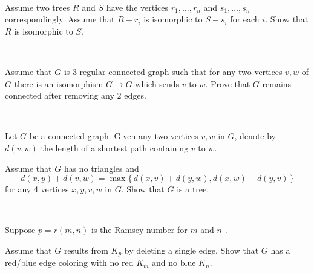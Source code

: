 \documentclass[oneside,a4paper]{article}
\begin{document}
\ 

Assume two trees $R$ and $S$ 
have the vertices $r_1,\dots,r_n$ and $s_1,\dots,s_n$ correspondingly.
Assume that $R-r_i$ is isomorphic to $S-s_i$ for each $i$.
Show that $R$ is isomorphic to $S$.

\ 

Assume that $G$ is $3$-regular connected graph such that 
for any two vertices $v,w$ of $G$ there is an isomorphism
$G\to G$ which sends $v$ to $w$.
Prove that $G$ remains connected after removing any $2$ edges.

\ 

Let $G$ be a connected graph.
Given any two vertices $v,w$ in $G$, denote by $d(v,w)$ the length of a shortest path containing $v$ to $w$. 

Assume that $G$ has no triangles and
\[d(x,y)+d(v,w)=\max\{\,d(x,v)+d(y,w),d(x,w)+d(y,v)\,\}\]
for any 4 vertices $x,y,v,w$ in $G$.
Show that $G$ is a tree.

\ 

Suppose $p=r(m,n)$ is the Ramsey number for $m$ and $n$%
.

Assume that $G$ results from $K_p$ by deleting a single edge.
Show that $G$ has a red/blue edge coloring with no red
$K_m$ and no blue $K_n$.
\end{document}
